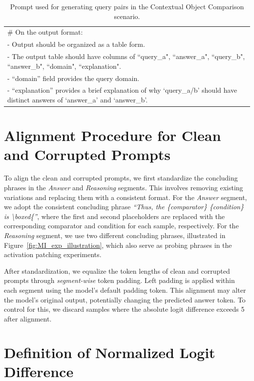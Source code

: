 \documentclass[11pt]{article}
\begin{document}
\begin{table}[htbp]
\begin{tabular}{p{15cm}}
    \\
    \# On the output format:\\
    - Output should be organized as a table form.\\
    - The output table should have columns of ``query\_a", ``answer\_a", ``query\_b", ``answer\_b", ``domain", ``explanation".\\
    - ``domain'' field provides the query domain.\\
    - ``explanation'' provides a brief explanation of why `query\_a/b' should have distinct answers of `answer\_a' and `answer\_b'.  \\  
    \bottomrule
    \end{tabular}
    \caption{Prompt used for generating query pairs in the Contextual Object Comparison scenario.}
    \label{tab:prompt_data_curation_COC}
\end{table}

\section{Alignment Procedure for Clean and Corrupted Prompts}
\label{app:prompt_alignment}

To align the clean and corrupted prompts, we first standardize the concluding phrases in the \textit{Answer} and \textit{Reasoning} segments. This involves removing existing variations and replacing them with a consistent format. For the \textit{Answer} segment, we adopt the consistent concluding phrase \textit{``Thus, the \{comparator\} \{condition\} is \textbackslash boxed\{''}, where the first and second placeholders are replaced with the corresponding comparator and condition for each sample, respectively. For the \textit{Reasoning} segment, we use two different concluding phrases, illustrated in Figure~\ref{fig:MI_exp_illustration}, which also serve as probing phrases in the activation patching experiments.

After standardization, we equalize the token lengths of clean and corrupted prompts through \textit{segment-wise} token padding. Left padding is applied within each segment using the model's default padding token. This alignment may alter the model's original output, potentially changing the predicted answer token. To control for this, we discard samples where the absolute logit difference exceeds 5 after alignment.

\section{Definition of Normalized Logit Difference}
\label{app:logit_diff}
\end{document}
